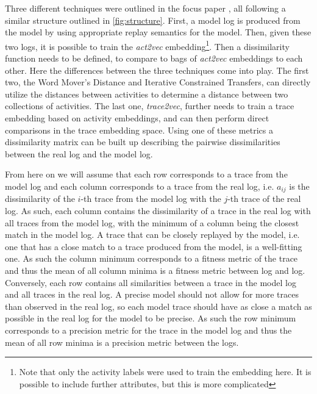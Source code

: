 \documentclass[runningheads]{template/llncs}
\begin{document}
Three different techniques were outlined in the focus paper \cite{PBWe20}, all following a similar structure outlined in \cref{fig:structure}.
First, a model log is produced from the model by using appropriate replay semantics for the model.
Then, given these two logs, it is possible to train the \emph{act2vec} \cite{KBWe18} embedding\footnote{Note that only the activity labels were used to train the embedding here. It is possible to include further attributes, but this is more complicated}.
Then a dissimilarity function needs to be defined, to compare to bags of \emph{act2vec} embeddings to each other.
Here the differences between the three techniques come into play.
The first two, the Word Mover's Distance \cite{KSKW15} and Iterative Constrained Transfers, can directly utilize the distances between activities to determine a distance between two collections of activities.
The last one, \emph{trace2vec}, further needs to train a trace embedding based on activity embeddings, and can then perform direct comparisons in the trace embedding space.
Using one of these metrics a dissimilarity matrix can be built up describing the pairwise dissimilarities between the real log and the model log.

From here on we will assume that each row corresponds to a trace from the model log and each column corresponds to a trace from the real log, i.e. $a_{ij}$ is the dissimilarity of the $i$-th trace from the model log with the $j$-th trace of the real log.
As such, each column contains the dissimilarity of a trace in the real log with all traces from the model log, with the minimum of a column being the closest match in the model log.
A trace that can be closely replayed by the model, i.e. one that has a close match to a trace produced from the model, is a well-fitting one.
As such the column minimum corresponds to a fitness metric of the trace and thus the mean of all column minima is a fitness metric between log and log.
Conversely, each row contains all similarities between a trace in the model log and all traces in the real log.
A precise model should not allow for more traces than observed in the real log, so each model trace should have as close a match as possible in the real log for the model to be precise.
As such the row minimum corresponds to a precision metric for the trace in the model log and thus the mean of all row minima is a precision metric between the logs.
\end{document}
